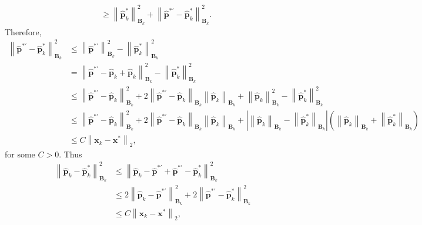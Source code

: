 \documentclass[aos]{imsart}
\numberwithin{equation}{section}
\theoremstyle{plain}
\begin{document}
\begin{appendix}
\begin{equation*}
\begin{split}
            & \geq  \left\|  \hat{\bm{p}}_{k}^{*}  \right\|_{\bm{B}_{k}}^2 + \left\|   \hat{\bm{p}}^{* \prime} - \hat{\bm{p}}_{k}^{*} \right\|_{\bm{B}_{k}}^2. 
        \end{split}
    \end{equation*}
    Therefore, 
    \begin{equation*}
       \begin{split}
            \left\| \hat{\bm{p}}^{* \prime} - \hat{\bm{p}}_{k}^{*} \right\|_{\bm{B}_{k}}^2 & \leq \left\| \hat{\bm{p}}^{* \prime} \right\|_{\bm{B}_{k}}^2  - \left\|  \hat{\bm{p}}_{k}^{*}  \right\|_{\bm{B}_{k}}^2 \\
            & = \left\| \hat{\bm{p}}^{* \prime} - \hat{\bm{p}}_{k} + \hat{\bm{p}}_{k} \right\|_{\bm{B}_{k}}^2  - \left\|  \hat{\bm{p}}_{k}^{*}  \right\|_{\bm{B}_{k}}^2 \\
            & \leq \left\| \hat{\bm{p}}^{* \prime} - \hat{\bm{p}}_{k}  \right\|_{\bm{B}_{k}}^2 + 2 \left\| \hat{\bm{p}}^{* \prime} - \hat{\bm{p}}_{k}  \right\|_{\bm{B}_{k}} \left\| \hat{\bm{p}}_{k}  \right\|_{\bm{B}_{k}} + \left\| \hat{\bm{p}}_{k}  \right\|_{\bm{B}_{k}}^2 - \left\|  \hat{\bm{p}}_{k}^{*}  \right\|_{\bm{B}_{k}}^2 \\ 
            & \leq \left\| \hat{\bm{p}}^{* \prime} - \hat{\bm{p}}_{k}  \right\|_{\bm{B}_{k}}^2 + 2 \left\| \hat{\bm{p}}^{* \prime} - \hat{\bm{p}}_{k}  \right\|_{\bm{B}_{k}} \left\| \hat{\bm{p}}_{k}  \right\|_{\bm{B}_{k}} + \left|\left\| \hat{\bm{p}}_{k}  \right\|_{\bm{B}_{k}} - \left\|  \hat{\bm{p}}_{k}^{*}  \right\|_{\bm{B}_{k}} \right| \left( \left\| \hat{\bm{p}}_{k}  \right\|_{\bm{B}_{k}} + \left\|  \hat{\bm{p}}_{k}^{*}  \right\|_{\bm{B}_{k}} \right) \\
            & \leq C \left\| \bm{x}_{k} - \bm{x}^{*} \right\|_2,
       \end{split} 
    \end{equation*}
    for some $C > 0$. Thus
    \begin{equation}
        \begin{split}
            \left\| \hat{\bm{p}}_{k} - \hat{\bm{p}}_{k}^{*} \right\|_{\bm{B}_{k}}^2 & \leq \left\| \hat{\bm{p}}_{k} -\hat{\bm{p}}^{* \prime} + \hat{\bm{p}}^{* \prime} - \hat{\bm{p}}_{k}^{*} \right\|_{\bm{B}_{k}}^2 \\
            & \leq 2 \left\| \hat{\bm{p}}_{k} -\hat{\bm{p}}^{* \prime}  \right\|_{\bm{B}_{k}}^2 + 2 \left\| \hat{\bm{p}}^{* \prime} - \hat{\bm{p}}_{k}^{*} \right\|_{\bm{B}_{k}}^2 \\
            & \leq C \left\| \bm{x}_{k} - \bm{x}^{*} \right\|_2,

\end{split}
\end{equation}
\end{appendix}
\end{document}
